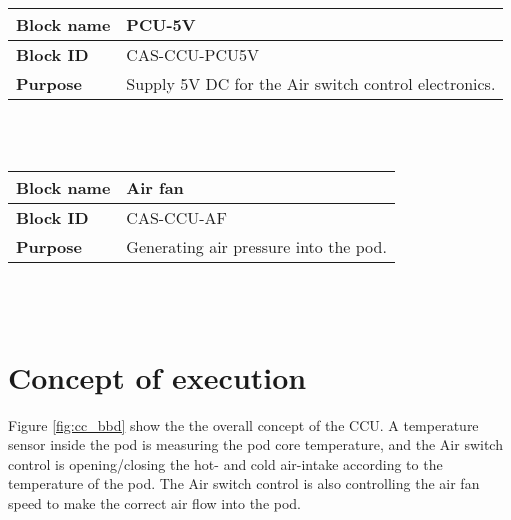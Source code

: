 \begin{tabular}{|l|p{10cm}|}
    \hline
    \textbf{Block name}     & PCU-5V \\
    \hline
    \textbf{Block ID}       & CAS-CCU-PCU5V \\
    \hline
    \textbf{Purpose}        & Supply 5V DC for the Air switch control electronics. \\
    \hline
\end{tabular}\\\\

\begin{tabular}{|l|p{10cm}|}
    \hline
    \textbf{Block name}     & Air fan \\
    \hline
    \textbf{Block ID}       & CAS-CCU-AF \\
    \hline
    \textbf{Purpose}        & Generating air pressure into the pod. \\
    \hline
\end{tabular}\\\\

\pagebreak

\section{Concept of execution}
\label{sec:concept_execution}

Figure \ref{fig:cc_bbd} show the the overall concept of the CCU. A temperature sensor inside the pod is measuring the pod core temperature, and the Air switch control is opening/closing the hot- and cold air-intake according to the temperature of the pod. The Air switch control is also controlling the air fan speed to make the correct air flow into the pod.


